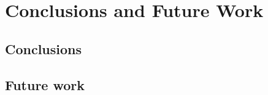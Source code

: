 \chapter{Conclusions and Future Work}
\label{cha:Conclusions and Future Work}

\section{Conclusions}
\section{Future work}
